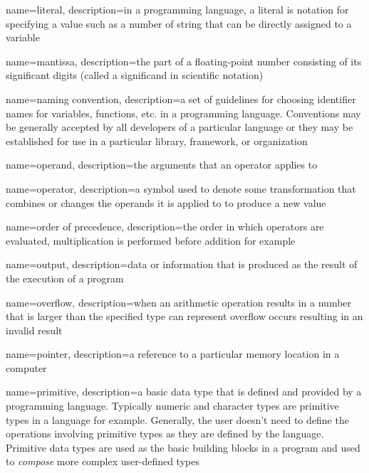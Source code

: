 {
  name=literal,
  description={in a programming language, a literal is notation for specifying a value such as a number of string that can be 
  	directly assigned to a variable}
}

{
  name=mantissa,
  description={the part of a floating-point number consisting of its significant digits (called a significand in scientific notation)}
}

{
  name=naming convention,
  description={a set of guidelines for choosing identifier names for variables, functions, etc. in a programming language.  Conventions may be generally accepted by all developers of a particular language or they may be established for use in a particular library, framework, or organization}
}

{
  name=operand,
  description={the arguments that an operator applies to}
}

{
  name=operator,
  description={a symbol used to denote some transformation that combines or changes the operands it is applied to to produce a new value}
}

{
  name=order of precedence,
  description={the order in which operators are evaluated, multiplication is performed before addition for example}
}

{
  name=output,
  description={data or information that is produced as the result of the execution of a program}
}

{
  name=overflow,
  description={when an arithmetic operation results in a number that is larger than the specified type can represent overflow occurs resulting in an invalid result}
}

{
  name=pointer,
  description={a reference to a particular memory location in a computer}
}

{
  name=primitive,
  description={a basic data type that is defined and provided by a programming language.  Typically numeric and character types are primitive types in a language for example.  Generally, the user doesn't need to define the operations involving primitive types as they are defined by the language.  Primitive data types are used as the basic building blocks in a program and used to \emph{compose} more complex user-defined types}
}

